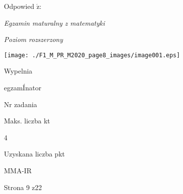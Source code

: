 \documentclass[a4paper,12pt]{article}
\begin{document}
Odpowied $\acute{\mathrm{z}}$:

{\it Egzamin maturalny z matematyki}

{\it Poziom rozszerzony}
\begin{center}
\texttt{[image: ./F1\_M\_PR\_M2020\_page8\_images/image001.eps]}
\end{center}
Wypelnia

egzamÍnator

Nr zadania

Maks. liczba kt

4

Uzyskana liczba pkt

MMA-IR

Strona 9 z22
\end{document}
